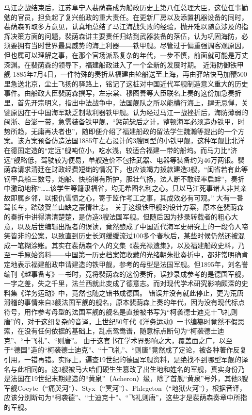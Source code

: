 \documentclass[12pt,UTF8]{ctexbook}
\begin{document}
马江之战结束后，江苏阜宁人裴荫森成为船政历史上第八任总理大臣，这位任事勤勉的官员，担负起了复兴船政的重大责任。在更新厂房以及添置机器设备的同时，裴荫森听取多方意见，认真地总结了马江海战失败的经验，抛开难以随意涉及的指挥决策方面的问题，裴荫森讲主要责任归结到武器装备的落伍，认为巩固海防，必须要拥有当时世界最具威势的海上利器——铁甲舰。尽管过于偏重强调客观原因，但也属可以理解之事，在那个官场派系复杂的年代，一步不慎，前面就可能是万丈深渊。在裴荫森的领导下，福建船政进入了一个全新的发展时期。
近海防御铁甲舰
1885年7月4日，一件特殊的奏折从福建由轮船送至上海，再由驿站快马加鞭500里急送北京，尘土飞扬的驿路上，铭记了这桩对中国近代军舰制造意义重大的历史事件。由船政大臣裴荫森撰写，左宗棠、穆图善等大臣联名上奏的这份加急奏折里，首先开宗明义，指出中法战争中，法国舰队之所以能横行海上，肆无忌惮，关键原因在于中国海军缺乏制敌利器铁甲舰。认为经过马江一战挫折后，海防薄弱的闽浙、台澎一带，急需装备铁甲舰，“惩前毖后之计，整顿海军必须造办铁甲，时势所趋，无庸再决者也”，随即便介绍了福建船政的留法学生魏瀚等提出的一个方案。该方案预备仿造法国1885年左右设计的3艘同型的小铁甲舰，这种军舰比北洋在德国定造的“定远”舰吨位小，吃水浅，较适合福建一带的船坞。而马力比“济远”舰略低，驾驶较为便易，单艘造价不包括武器、电器等装备约为46万两银。裴荫森请求清廷在财政经费短绌的情况下，也应该竭力拨款建造3艘，“闽省若有此等钢甲兵船三数号，炮船、快船得有所护，胆壮气扬，法人断不敢轻率启衅”，奏折中激动地称“……该学生等籍隶福省，均无希图名利之心。只以马江死事诸人非其亲故即属乡邻，以报仇雪愤之心，寄于监作考工之事，其成效必有可观。” 大有一番驾长车，踏破贺兰山缺之豪情壮志。
关于这级铁甲舰的设计方案，原本在裴荫森的奏折中讲得清清楚楚，是仿造3艘法国军舰。但随后因为抄录转载者的粗心大意，以及后世编辑出版者的误读，竟然酿成了中国近代海军史研究上的一段令人啼笑皆非的公案，以致直到历史长河缓缓流过100多个春秋后，某些时候仍然还被混成一笔糊涂账。其实在裴荫森个人的文集《裴光禄遗集》，以及福建船政史料，乃至一手原始资料——中国第一历史档案馆收藏的光绪朝朱批奏折中，都非常明确肯定地表示福建船政申请建造的铁甲舰，参考的母型是法国军舰。但1895年，刘名誉编刊《越事备考》一书时，竟将裴荫森的这份奏折，误抄录成参考的是德国军舰，一字之差，失之千里，法兰西就此变成了德意志。而对现代学术研究影响颇深的史料集《洋务运动》中，竟然也随之错书成德国。
错误并没有就此停止，更为荒唐滑稽的事情来自3艘法国军舰的舰名，原本裴荫森上奏的年代，因为没有现代标点符号，用作参考母型的法国军舰的舰名是直接被书写为“柯袭德士迪克十飞礼则唐”的，对于这组复杂的音译，上世纪50年代《洋务运动》一书编纂时竟然不假思索，在没有任何依据的基础上，乱点鸳鸯谱，随意标点断句为“柯袭德士迪克”、“十飞礼”、“则唐”。 由于这套书在学术界影响之大，覆盖面之广，以至于“德国”造的“柯袭德士迪克”、“十飞礼”、“则唐”竟然成了定论，被各种著作反复引用，一错再错。实际上，遍查19世纪的德国军舰资料，是绝找不到哪型军舰的译名与此相同的。这3艘被马大哈们硬生生篡改了出生地和姓名的军舰，真实身份乃是法国在19世纪末期建造的“黄泉”（Acheron）级，除了首舰“黄泉”号外，其他3艘军舰Cocyte（“痛哭河”）、Styx（“冥河”）、Phlegeton（“地狱火河”），根据音译，应该分别断句为“柯袭德”、“士迪克十”、“飞礼则唐”，这些才是裴荫森奏章中所指的军舰。
\end{document}
